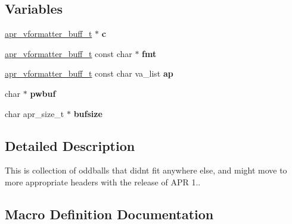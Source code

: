 \subsection*{Variables}
\begin{DoxyCompactItemize}
\item 
\mbox{\label{group__apr__lib_ga0823c5d125363d133fed61fb69c69cdd}} 
\mbox{\hyperlink{structapr__vformatter__buff__t}{apr\+\_\+vformatter\+\_\+buff\+\_\+t}} $\ast$ {\bfseries c}
\item 
\mbox{\label{group__apr__lib_ga776e5cba9e51aac9902b10c9a2c354cc}} 
\mbox{\hyperlink{structapr__vformatter__buff__t}{apr\+\_\+vformatter\+\_\+buff\+\_\+t}} const char $\ast$ {\bfseries fmt}
\item 
\mbox{\label{group__apr__lib_ga21ecbc810cd93b85a818c96ca2f92f1a}} 
\mbox{\hyperlink{structapr__vformatter__buff__t}{apr\+\_\+vformatter\+\_\+buff\+\_\+t}} const char va\+\_\+list {\bfseries ap}
\item 
\mbox{\label{group__apr__lib_gac94b4a094f5865d6a5d4a7b04929e528}} 
char $\ast$ {\bfseries pwbuf}
\item 
\mbox{\label{group__apr__lib_ga423d6c42d72a554fc31208493f49913e}} 
char apr\+\_\+size\+\_\+t $\ast$ {\bfseries bufsize}
\end{DoxyCompactItemize}


\subsection{Detailed Description}
This is collection of oddballs that didn\textquotesingle{}t fit anywhere else, and might move to more appropriate headers with the release of A\+PR 1.. 

\subsection{Macro Definition Documentation}
\mbox{\label{group__apr__lib_gaa3b0264aadbd9f8d805252fb1ca1cd0e}} 

